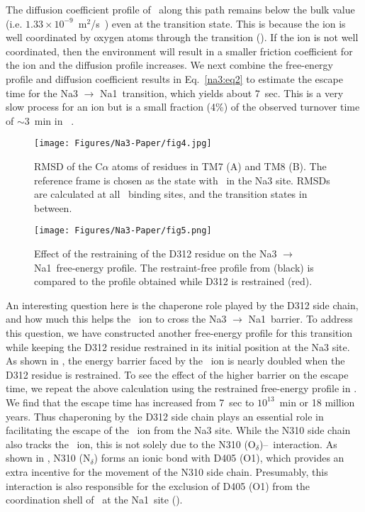 The diffusion coefficient profile of \Na\ along this path remains below the bulk value (i.e. 
$1.33 \times 10^{-9}$~m$^2$/s~\cite{Harned1958}) even at the transition state. This is because the 
ion is well coordinated by oxygen atoms through the transition (). If the ion is 
not well coordinated, then the environment will result in a smaller friction coefficient for the ion 
and the diffusion profile increases. We next combine the free-energy profile and diffusion coefficient 
results in Eq.~\eqref{na3:eq2} to estimate the escape time for the Na3 $\rightarrow$ Na1\prim\ transition, 
which yields about 7~sec. This is a very slow process for an ion but is a small fraction (4\%) of 
the observed turnover time of $\sim$3~min in \GltPh{}~\cite{Ryan2009}. 

\begin{figure}[t!]
\centering
 \texttt{[image: Figures/Na3-Paper/fig4.jpg]}
 \caption{RMSD of the C$\alpha$ atoms of residues in TM7 (A) and TM8 (B). The 
          reference frame is chosen as the state with \Na\ in the Na3 site. RMSDs 
          are calculated at all \Na\ binding sites, and the transition states in 
          between.}
\label{na3:fig4}
\end{figure}

\begin{figure}[b!]
\centering
 \texttt{[image: Figures/Na3-Paper/fig5.png]}
 \caption{Effect of the restraining of the D312 residue on the Na3 $\rightarrow$ 
          Na1\prim\ free-energy profile. The restraint-free profile from  
          (black) is compared to the profile obtained while D312 is restrained (red).}
\label{na3:fig5}
\end{figure}

An interesting question here is the chaperone role played by the D312 side chain, and how much this 
helps the \Na\ ion to cross the Na3 $\rightarrow$ Na1\prim\ barrier. To address this question, we 
have constructed another free-energy profile for this transition while keeping the D312 residue 
restrained in its initial position at the Na3 site. As shown in , the energy barrier 
faced by the \Na\ ion is nearly doubled when the D312 residue is restrained. To see the effect of the 
higher barrier on the escape time, we repeat the above calculation using the restrained free-energy 
profile in . We find that the escape time has increased from 7~sec to $10^{13}$~min 
or 18 million years. Thus chaperoning by the D312 side chain plays an essential role in facilitating 
the escape of the \Na\ ion from the Na3 site. While the N310 side chain also tracks the \Na\ ion, 
this is not solely due to the N310 (O$_{\delta}$)--\Na\ interaction. As shown in 
, N310 (N$_{\delta}$) forms an ionic bond with D405 (O1), 
which provides an extra incentive for the movement of the N310 side chain. Presumably, this interaction 
is also responsible for the exclusion of D405 (O1) from the coordination shell of \Na\ at the Na1\prim\ 
site ().

